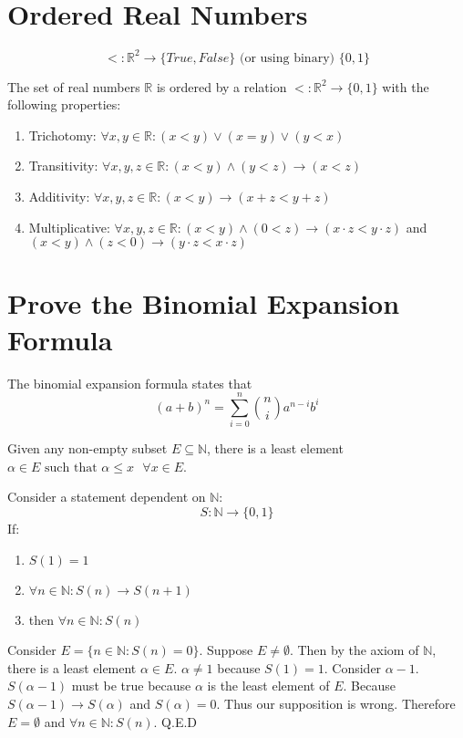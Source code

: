 \documentclass{article}
\begin{document}
\section{Ordered Real Numbers}
\begin{definition}
    $$<: \mathbb{R}^2 \longrightarrow \{\textit{True},\textit{False} \} \text{ (or using binary) } \{0, 1\}$$
\end{definition}
The set of real numbers $\mathbb{R}$ is ordered by a relation $<: \mathbb{R}^2 \rightarrow \{0, 1\}$ with the following properties:
\begin{enumerate}
    \item Trichotomy: $\forall x, y \in \mathbb{R} : (x < y) \lor (x = y) \lor (y < x)$
    \item Transitivity: $\forall x, y, z \in \mathbb{R} : (x < y) \land (y < z) \rightarrow (x < z)$
    \item Additivity: $\forall x, y, z \in \mathbb{R} : (x < y) \rightarrow (x + z < y + z)$
    \item Multiplicative: $\forall x, y, z \in \mathbb{R} : (x < y) \land (0 < z) \rightarrow (x \cdot z < y \cdot z)$ and $(x < y) \land (z < 0) \rightarrow (y \cdot z < x \cdot z)$
    
\end{enumerate}

\section{Prove the Binomial Expansion Formula}
The binomial expansion formula states that $$(a + b)^n = \sum_{i = 0}^{n} \binom{n}{i}a^{n-i} b^{i}$$
\begin{axiom}
    Given any non-empty subset $E \subseteq \mathbb{N}$, there is a least element $\alpha \in E \text{ such that } \alpha \leq x \text{   } \forall x \in E$.
\end{axiom}

\begin{theorem}
Consider a statement dependent on $\mathbb{N}$: $$S: \mathbb{N} \longrightarrow \{0, 1\}$$
If: \\ 
\begin{enumerate}
    \item $S(1) = 1$ 
    \item $\forall n \in \mathbb{N} : S(n) \rightarrow S(n+1)$
    \item then $\forall n \in \mathbb{N} : S(n)$
\end{enumerate}
\begin{proofbox}
Consider $E = \{n \in \mathbb{N} : S(n) = 0\}$.
 Suppose $E \neq \emptyset$. 
 Then by the axiom of $\mathbb{N}$, 
 there is a least element $\alpha \in E$.
  $\alpha \neq 1$ because $S(1) = 1$. 
  Consider $\alpha - 1$. $S(\alpha - 1)$ 
  must be true because $\alpha$ is the least element of $E$.
   Because $S(\alpha - 1) \rightarrow S(\alpha)$ and $S(\alpha) = 0$.
    Thus our supposition is wrong. Therefore $E = \emptyset$ and $\forall n \in \mathbb{N} : S(n)$. Q.E.D

\end{proofbox}
\end{theorem}
\end{document}
